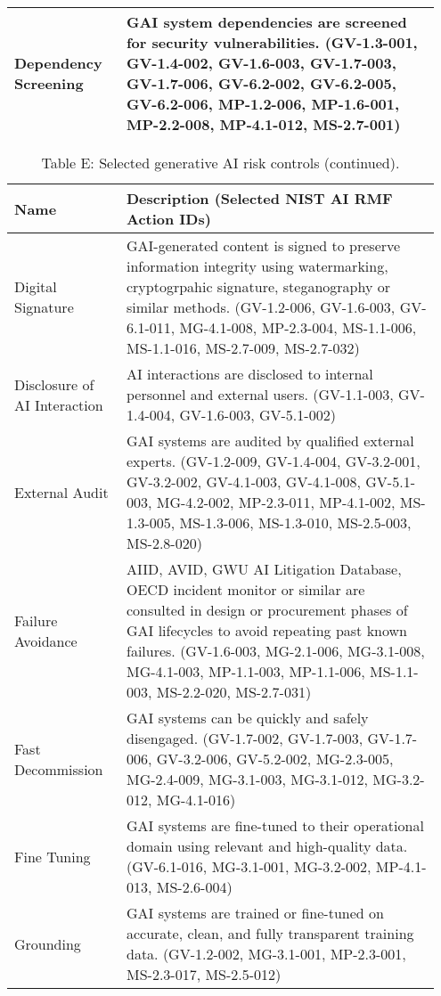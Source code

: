\documentclass[fleqn]{article}
\begin{document}
\begin{table}[H]
\begin{tabular}{|m{0.25\linewidth} |m{0.70\linewidth} |}
		\hline
		Dependency Screening  & GAI system dependencies are screened for security vulnerabilities. (GV-1.3-001, GV-1.4-002, GV-1.6-003, GV-1.7-003, GV-1.7-006, GV-6.2-002, GV-6.2-005, GV-6.2-006, MP-1.2-006, MP-1.6-001, MP-2.2-008, MP-4.1-012, MS-2.7-001) \\ 
		\hline
	\end{tabular}
\end{table}		
\pagebreak	
		
\begin{table}[H]
	\caption*{Table E: Selected generative AI risk controls (continued).}
	\label{tab:controls_cont}
	\footnotesize
	\begin{tabular}{|m{0.25\linewidth} |m{0.70\linewidth} |}
		\hline
		\textbf{Name} & \textbf{Description} (Selected NIST AI RMF Action IDs) \\
		\hline		
		Digital Signature & GAI-generated content is signed to preserve information integrity using watermarking, cryptogrpahic signature, steganography or similar methods. (GV-1.2-006, GV-1.6-003, GV-6.1-011, MG-4.1-008, MP-2.3-004, MS-1.1-006, MS-1.1-016, MS-2.7-009, MS-2.7-032) \\ 
		\hline
		Disclosure of AI Interaction & AI interactions are disclosed to internal personnel and external users. (GV-1.1-003, GV-1.4-004, GV-1.6-003, GV-5.1-002) \\ 
		\hline
		External Audit & GAI systems are audited by qualified external experts. (GV-1.2-009, GV-1.4-004, GV-3.2-001, GV-3.2-002, GV-4.1-003, GV-4.1-008, GV-5.1-003, MG-4.2-002, MP-2.3-011, MP-4.1-002, MS-1.3-005, MS-1.3-006, MS-1.3-010, MS-2.5-003, MS-2.8-020) \\ 
		\hline
		Failure Avoidance & AIID, AVID, GWU AI Litigation Database, OECD incident monitor or similar are consulted in design or procurement phases of GAI lifecycles to avoid repeating past known failures. (GV-1.6-003, MG-2.1-006, MG-3.1-008, MG-4.1-003, MP-1.1-003, MP-1.1-006, MS-1.1-003, MS-2.2-020, MS-2.7-031) \\ \hline
		Fast Decommission & GAI systems can be quickly and safely disengaged. (GV-1.7-002, GV-1.7-003, GV-1.7-006, GV-3.2-006, GV-5.2-002, MG-2.3-005, MG-2.4-009, MG-3.1-003, MG-3.1-012, MG-3.2-012, MG-4.1-016) \\
		\hline		
		Fine Tuning & GAI systems are fine-tuned to their operational domain using relevant and high-quality data. (GV-6.1-016, 	MG-3.1-001, MG-3.2-002, MP-4.1-013, MS-2.6-004) \\ 
		\hline
		Grounding & GAI systems are trained or fine-tuned on accurate, clean, and fully transparent training data. (GV-1.2-002, MG-3.1-001, MP-2.3-001, MS-2.3-017, MS-2.5-012) \\ 

\end{tabular}
\end{table}
\end{document}
